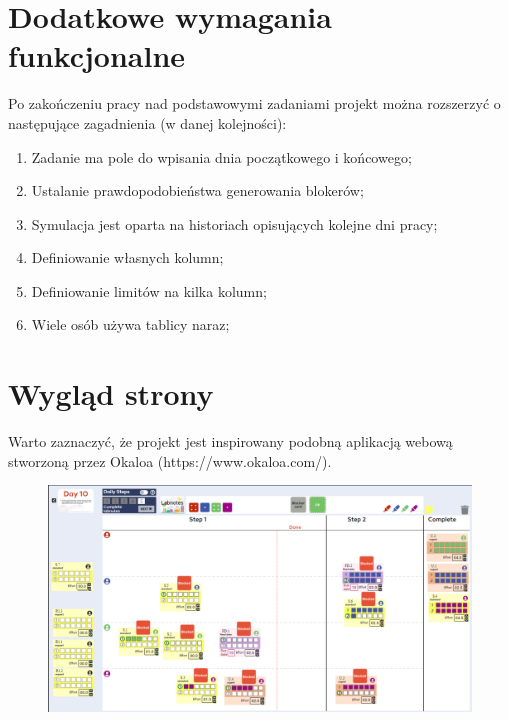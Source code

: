 \documentclass{article}
\begin{document}
\section{Dodatkowe wymagania funkcjonalne}
Po zakończeniu pracy nad podstawowymi zadaniami projekt można rozszerzyć o następujące zagadnienia (w danej kolejności):

\begin{enumerate}
    \item Zadanie ma pole do wpisania dnia początkowego i końcowego;
    \item Ustalanie prawdopodobieństwa generowania blokerów;
    \item Symulacja jest oparta na historiach opisujących kolejne dni pracy;
    \item Definiowanie własnych kolumn;
    \item Definiowanie limitów na kilka kolumn;
    \item Wiele osób używa tablicy naraz;
\end{enumerate}

\clearpage

\section{Wygląd strony}
Warto zaznaczyć, że projekt jest inspirowany podobną aplikacją webową stworzoną przez Okaloa (https://www.okaloa.com/).

 \begin{figure} [hbt!]
        \centering
        \includegraphics[width=16cm]{img/kanban_by_okaloa.png}
    \end{figure}
    
\end{document}
